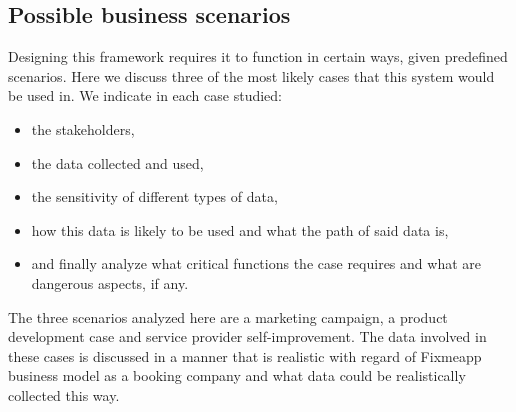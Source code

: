 \documentclass[english, 12pt, a4paper, sci, utf8, a-2b, online]{aaltothesis}
\theoremstyle{change}
\theoremstyle{theoremstyle}
\begin{document}
\subsection{Possible business scenarios}\label{sec: business_scen}
Designing this framework requires it to function in certain ways, given predefined scenarios. Here we discuss three of the most likely cases that this system would be used in. We indicate in each case studied:
\begin{itemize}
    \item the stakeholders,
    \item the data collected and used,
    \item the sensitivity of different types of data,
    \item how this data is likely to be used and what the path of said data is,
    \item and finally analyze what critical functions the case requires and what are dangerous aspects, if any.
\end{itemize} 
The three scenarios analyzed here are a marketing campaign, a product development case and service provider self-improvement. The data involved in these cases is discussed in a manner that is realistic with regard of Fixmeapp business model as a booking company and what data could be realistically collected this way.
\end{document}
